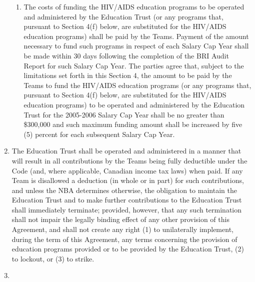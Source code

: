 \documentclass[
]{book}
\begin{document}
\begin{enumerate}
\begin{enumerate}
  \item
    The costs of funding the HIV/AIDS education programs to be operated and administered by the Education Trust (or any programs that, pursuant to Section 4(f) below, are substituted for the HIV/AIDS education programs) shall be paid by the Teams. Payment of the amount necessary to fund such programs in respect of each Salary Cap Year shall be made within 30 days following the completion of the BRI Audit Report for such Salary Cap Year. The parties agree that, subject to the limitations set forth in this Section 4, the amount to be paid by the Teams to fund the HIV/AIDS education programs (or any programs that, pursuant to Section 4(f) below, are substituted for the HIV/AIDS education programs) to be operated and administered by the Education Trust for the 2005-2006 Salary Cap Year shall be no greater than \$300,000 and such maximum funding amount shall be increased by five (5) percent for each subsequent Salary Cap Year.
  \end{enumerate}
\item
  The Education Trust shall be operated and administered in a manner that will result in all contributions by the Teams being fully deductible under the Code (and, where applicable, Canadian income tax laws) when paid. If any Team is disallowed a deduction (in whole or in part) for such contributions, and unless the NBA determines otherwise, the obligation to maintain the Education Trust and to make further contributions to the Education Trust shall immediately terminate; provided, however, that any such termination shall not impair the legally binding effect of any other provision of this Agreement, and shall not create any right (1) to unilaterally implement, during the term of this Agreement, any terms concerning the provision of education programs provided or to be provided by the Education Trust, (2) to lockout, or (3) to strike.
\item

\end{enumerate}
\end{document}

